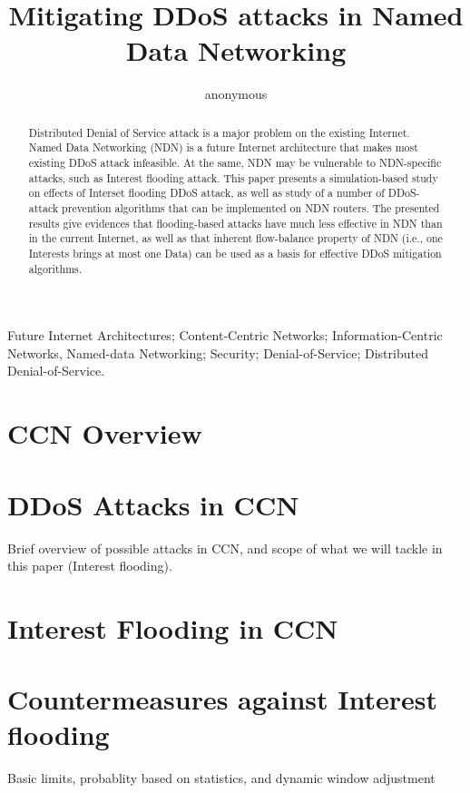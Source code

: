 \documentclass[conference]{IEEEtran}
\title{Mitigating DDoS attacks in Named Data Networking}%
\author{anonymous}
\begin{document}
\maketitle

\begin{abstract}
%
Distributed Denial of Service attack is a major problem on the existing Internet.
Named Data Networking (NDN) is a future Internet architecture that makes most existing DDoS attack infeasible.
At the same, NDN may be vulnerable to NDN-specific attacks, such as Interest flooding attack. 
This paper presents a simulation-based study on effects of Interset flooding DDoS attack, as well as study of a number of DDoS-attack prevention algorithms that can be implemented on NDN routers.
The presented results give evidences that flooding-based attacks have much less effective in NDN than in the current Internet, as well as that inherent flow-balance property of NDN (i.e., one Interests brings at most one Data) can be used as a basis for effective DDoS mitigation algorithms. 
%
\end{abstract}

 Future Internet Architectures;
Content-Centric Networks; Information-Centric Networks, Named-data
Networking; Security; Denial-of-Service; Distributed
Denial-of-Service.



\section{ CCN Overview\label{ccn-intro}}

\section { DDoS Attacks in CCN \label{ccn-ddos}}
Brief overview of possible attacks in CCN, and scope of what we will tackle in this paper (Interest flooding).

\section { Interest Flooding in CCN }

\section {Countermeasures against Interest flooding}

Basic limits, probablity based on statistics, and dynamic window adjustment
\end{document}
